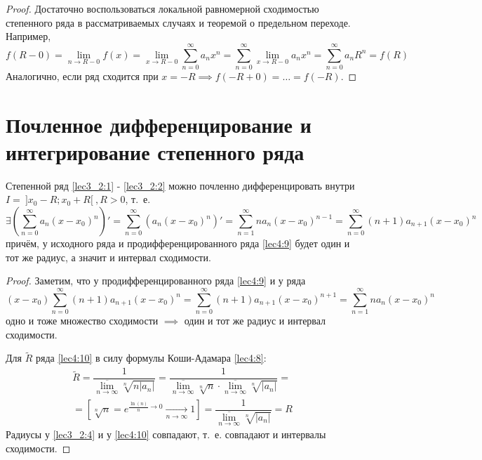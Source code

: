 \documentclass[../../main.tex]{subfiles}
\begin{document}
\begin{proof}
	Достаточно воспользоваться локальной равномерной сходимостью
	степенного ряда в рассматриваемых случаях и 
	теоремой о предельном переходе. Например,
	\[ f(R - 0) = \underset{n \to R - 0}{\lim} f(x) = 
	\underset{x \to R - 0}{\lim} \sum\limits_{n = 0}^{\infty} a_n x^n =
	\sum\limits_{n = 0}^{\infty} \underset{x \to R - 0}{\lim} a_n x^n = 
	\sum\limits_{n = 0}^{\infty} a_n R^n = f(R)
	\]
	Аналогично, если ряд сходится при $x = -R \implies f(-R + 0) = 
	\ldots = f(-R)$.
\end{proof}

\section{Почленное дифференцирование и интегрирование степенного ряда}

\begin{thm}
	Степенной ряд \eqref{lec3_2:1} - \eqref{lec3_2:2} можно почленно 
	дифференцировать внутри $I = \: ]x_0 - R; x_0 + R[ \:, R > 0$, т.~е.
	\begin{equation} \label{lec4:9}
		\exists \left( \sum\limits_{n = 0}^{\infty} a_n(x - x_0)^n \right)' = 
		\sum\limits_{n = 0}^{\infty} \left( a_n(x - x_0)^n \right)' = 
		\sum\limits_{n = 1}^{\infty} n a_n(x - x_0)^{n - 1} = 
		\sum\limits_{n = 0}^{\infty} (n + 1)a_{n + 1} (x - x_0)^n
	\end{equation} 
	причём, у исходного ряда и продифференцированного ряда 
	\eqref{lec4:9} будет один и тот же радиус, а значит и интервал сходимости.
\end{thm}

\begin{proof}
	Заметим, что у продифференцированного ряда \eqref{lec4:9} и у ряда \\
	\begin{equation} \label{lec4:10}
		(x - x_0) \sum\limits_{n = 0}^{\infty} (n + 1)a_{n + 1}(x - x_0)^n = 
		\sum\limits_{n = 0}^{\infty} (n + 1) a_{n + 1} (x - x_0)^{n + 1} = 
		\sum\limits_{n = 1}^{\infty} n a_n (x - x_0)^n
	\end{equation}
	одно и тоже множество сходимости $\implies $ один и тот же 
	радиус и интервал сходимости.
	
	Для $\widetilde{R}$ ряда \eqref{lec4:10} в силу 
	формулы Коши-Адамара \eqref{lec4:8}: 
	\[ \begin{gathered}
	\widetilde{R} = \dfrac{1}{  \underset{n \to \infty}{\overline{\lim}}
	\sqrt[n]{n|a_n|}  } = 
	\dfrac{1}{  \underset{n \to \infty}{\overline{\lim}} \sqrt[n]{n}
	\cdot \underset{n \to \infty}{\overline{\lim}} \sqrt[n]{|a_n|}  } = \\
	= \left[ \sqrt[n]{n} = e^{ \frac{\ln(n)}{n} \rightarrow 0 } 
	\underset{n \to \infty}{\longrightarrow} 1 \right] = 
	\dfrac{1}{  \underset{n \to \infty}{\overline{\lim}} \sqrt[n]{|a_n|} } = R
	\end{gathered} \]
	Радиусы у \eqref{lec3_2:4} и у \eqref{lec4:10} совпадают, т.~е.
	совпадают и интервалы сходимости.
\end{proof}
\end{document}
